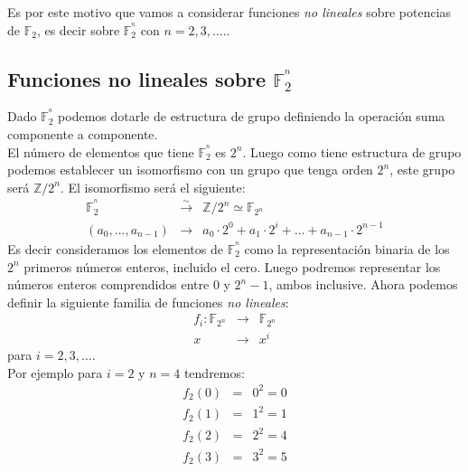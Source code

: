 Es por este motivo que vamos a considerar funciones \emph{no lineales} sobre
potencias de $\mathbb{F}_2$, es decir sobre $\mathbb{F}^{^n}_2$ con
$n=2,3,\dots.$.

\subsection{Funciones no lineales sobre $\mathbb{F}^{^n}_2$}

Dado $\mathbb{F}^{^n}_2$ podemos dotarle de estructura de grupo definiendo la
operaci\'on suma componente a componente.\\

El n\'umero de elementos que tiene $\mathbb{F}^{^n}_2$ es $2^n$. Luego como
tiene estructura de grupo podemos establecer un isomorfismo con un grupo que
tenga orden $2^n$, este grupo ser\'a $\mathbb{Z}/2^n$. El isomorfismo ser\'a
el siguiente:
\begin{eqnarray*}
\mathbb{F}^{^n}_2&\stackrel{\sim}\longrightarrow&\mathbb{Z}/2^n\simeq
\mathbb{F}_{2^n}\\
(a_{0},\dots,a_{n-1})&\longrightarrow& a_0\cdot 2^0+a_1\cdot 2^i+\dots+a_{n-1}
\cdot 2^{n-1}
\end{eqnarray*}
Es decir consideramos los elementos de $\mathbb{F}^{^n}_2$ como la
representaci\'on binaria de los $2^n$ primeros n\'umeros enteros, incluido el
cero. Luego podremos representar los n\'umeros enteros comprendidos entre $0$
y $2^n-1$, ambos inclusive.
%
\newpage
%
Ahora podemos definir la siguiente familia de funciones \emph{no lineales}:
\begin{eqnarray*}
f_i:\mathbb{F}_{2^n}&\longrightarrow&\mathbb{F}_{2^n}\\
x&\longrightarrow & x^i
\end{eqnarray*}
para $i=2,3,\dots$.\\

Por ejemplo para $i=2$ y $n=4$ tendremos:
\begin{eqnarray*}
f_2(0)&=&0^2=0\\
f_2(1)&=&1^2=1\\
f_2(2)&=&2^2=4\\
f_2(3)&=&3^2=5
\end{eqnarray*}
